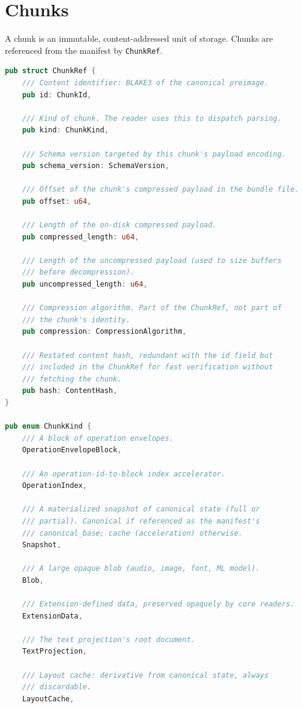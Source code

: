 \documentclass[11pt,letterpaper]{report}
\begin{document}
\section{Chunks}
\label{sec:format:chunks}

A chunk is an immutable, content-addressed unit of storage. Chunks
are referenced from the manifest by \texttt{ChunkRef}.

\begin{lstlisting}[language=Rust]
pub struct ChunkRef {
    /// Content identifier: BLAKE3 of the canonical preimage.
    pub id: ChunkId,

    /// Kind of chunk. The reader uses this to dispatch parsing.
    pub kind: ChunkKind,

    /// Schema version targeted by this chunk's payload encoding.
    pub schema_version: SchemaVersion,

    /// Offset of the chunk's compressed payload in the bundle file.
    pub offset: u64,

    /// Length of the on-disk compressed payload.
    pub compressed_length: u64,

    /// Length of the uncompressed payload (used to size buffers
    /// before decompression).
    pub uncompressed_length: u64,

    /// Compression algorithm. Part of the ChunkRef, not part of
    /// the chunk's identity.
    pub compression: CompressionAlgorithm,

    /// Restated content hash, redundant with the id field but
    /// included in the ChunkRef for fast verification without
    /// fetching the chunk.
    pub hash: ContentHash,
}

pub enum ChunkKind {
    /// A block of operation envelopes.
    OperationEnvelopeBlock,

    /// An operation-id-to-block index accelerator.
    OperationIndex,

    /// A materialized snapshot of canonical state (full or
    /// partial). Canonical if referenced as the manifest's
    /// canonical_base; cache (acceleration) otherwise.
    Snapshot,

    /// A large opaque blob (audio, image, font, ML model).
    Blob,

    /// Extension-defined data, preserved opaquely by core readers.
    ExtensionData,

    /// The text projection's root document.
    TextProjection,

    /// Layout cache: derivative from canonical state, always
    /// discardable.
    LayoutCache,


\end{lstlisting}
\end{document}
